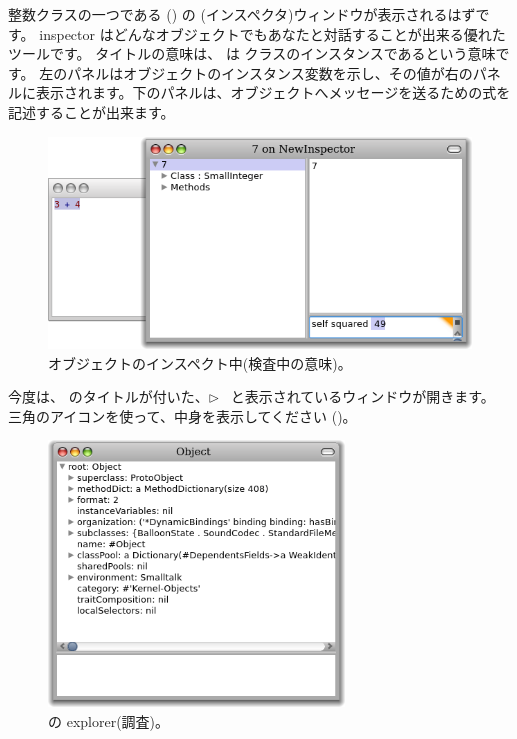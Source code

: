 \documentclass[a4paper,10pt,twoside]{book}
\begin{document}
{
\noindent
整数クラスの一つである  () の (インスペクタ)ウィンドウが表示されるはずです。
inspector はどんなオブジェクトでもあなたと対話することが出来る優れたツールです。
タイトルの意味は、 は  クラスのインスタンスであるという意味です。
左のパネルはオブジェクトのインスタンス変数を示し、その値が右のパネルに表示されます。下のパネルは、オブジェクトへメッセージを送るための式を記述することが出来ます。

\begin{figure}[htb]
\centerline {\includegraphics[width=\textwidth]{InspectIt}}
\caption{オブジェクトのインスペクト中(検査中の意味)。 }
\end{figure}



今度は、 のタイトルが付いた、\mbox{$\triangleright$ } と表示されているウィンドウが開きます。
三角のアイコンを使って、中身を表示してください ()。

\begin{figure}[htb]
\centerline {\includegraphics[width=0.7\textwidth]{ExploreIt}}
\caption{ の explorer(調査)。}
\end{figure}

}
\end{document}
